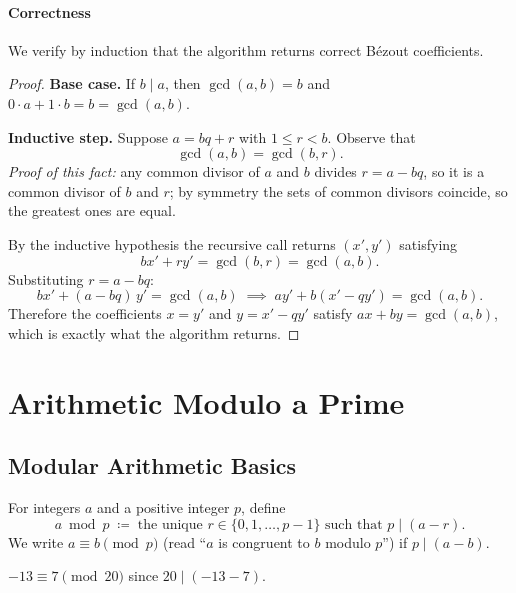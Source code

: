 \documentclass[11pt]{article}
\begin{document}
\paragraph{Correctness}
We verify by induction that the algorithm returns correct B\'ezout
coefficients.

\begin{proof}
  \textbf{Base case.} If $b \mid a$, then $\gcd(a, b) = b$ and
  $0 \cdot a + 1 \cdot b = b = \gcd(a, b)$. \checkmark

  \textbf{Inductive step.} Suppose $a = bq + r$ with $1 \le r < b$.
  Observe that
  \[
    \gcd(a, b) = \gcd(b, r).
  \]
  \textit{Proof of this fact:} any common divisor of $a$ and $b$ divides
  $r = a - bq$, so it is a common divisor of $b$ and $r$; by symmetry
  the sets of common divisors coincide, so the greatest ones are equal.

  By the inductive hypothesis the recursive call returns $(x', y')$
  satisfying
  \[
    bx' + ry' = \gcd(b, r) = \gcd(a, b).
  \]
  Substituting $r = a - bq$:
  \[
    bx' + (a - bq)\,y' = \gcd(a, b)
    \;\implies\;
    a y' + b(x' - qy') = \gcd(a, b).
  \]
  Therefore the coefficients $x = y'$ and $y = x' - qy'$ satisfy
  $ax + by = \gcd(a, b)$, which is exactly what the algorithm returns.
\end{proof}

\section{Arithmetic Modulo a Prime}

\subsection{Modular Arithmetic Basics}

\begin{definition}
  For integers $a$ and a positive integer $p$, define
  \[
    a \bmod p \;\coloneqq\; \text{the unique } r \in \{0, 1, \ldots, p-1\}
    \text{ such that } p \mid (a - r).
  \]
  We write $a \equiv b \pmod{p}$ (read ``$a$ is congruent to $b$
  modulo $p$'') if $p \mid (a - b)$.
\end{definition}

\begin{example}
  $-13 \equiv 7 \pmod{20}$ since $20 \mid (-13 - 7)$.
\end{example}
\end{document}
